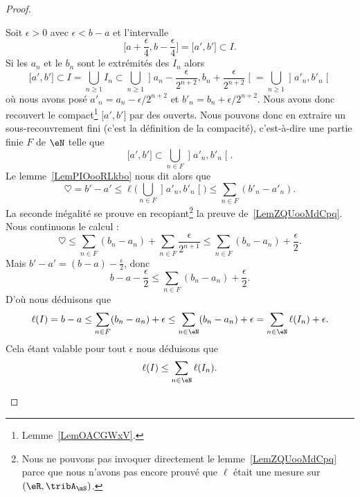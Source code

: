\begin{proof}
\begin{subproof}
		Soit \( \epsilon>0\) avec \( \epsilon<b-a\) et l'intervalle
		\begin{equation}
			\mathopen[ a+\frac{ \epsilon }{ 4 } , b-\frac{ \epsilon }{ 4 } \mathclose]=\mathopen[ a' , b' \mathclose]\subset I.
		\end{equation}
		Si les \( a_n\) et le \( b_n\) sont le extrémités des \( I_n\) alors
		\begin{equation}
			\mathopen[ a' , b' \mathclose]\subset I=\bigcup_{n\geq 1}I_n\subset\bigcup_{n\geq 1}\mathopen] a_n-\frac{ \epsilon }{ 2^{n+2} } , b_n+\frac{ \epsilon }{ 2^{n+2} } \mathclose[=\bigcup_{n\geq 1}\mathopen] a'_n , b'_n \mathclose[
		\end{equation}
		où nous avons posé \( a'_n=a_n-\epsilon/2^{n+2}\) et \( b'_n=b_n+\epsilon/2^{n+2}\). Nous avons donc recouvert le compact\footnote{Lemme~\ref{LemOACGWxV}.} \( \mathopen[ a' , b' \mathclose]\) par des ouverts. Nous pouvons donc en extraire un sous-recouvrement fini (c'est la définition de la compacité), c'est-à-dire une partie finie \( F\) de \( \eN\) telle que
		\begin{equation}
			\mathopen[ a' , b' \mathclose]\subset \bigcup_{n\in F}\mathopen] a'_n , b'_n \mathclose[.
		\end{equation}
		Le lemme~\ref{LemPIOooRLkbo} nous dit alors que
		\begin{equation}
			\heartsuit=b'-a'\leq \ell\big( \bigcup_{n\in F}\mathopen] a'_n , b'_n \mathclose[ \big)\leq \sum_{n\in F}(b'_n-a'_n).
		\end{equation}
		La seconde inégalité se prouve en recopiant\footnote{Nous ne pouvons pas invoquer directement le lemme~\ref{LemZQUooMdCpq} parce que nous n'avons pas encore prouvé que \( \ell\) était une mesure sur \(  (\eR,\tribA_{\mS})\).} la preuve de~\ref{LemZQUooMdCpq}. Nous continuons le calcul :
		\begin{equation}
			\heartsuit\leq\sum_{n\in F}(b_n-a_n)+\sum_{n\in F}\frac{ \epsilon }{ 2^{n+1} }\leq \sum_{n\in F}(b_n-a_n)+\frac{ \epsilon }{2}.
		\end{equation}
		Mais \( b'-a'=(b-a)-\frac{ \epsilon }{2}\), donc
		\begin{equation}
			b-a-\frac{ \epsilon }{2}\leq \sum_{n\in F}(b_n-a_n)+\frac{ \epsilon }{2}.
		\end{equation}
		D'où nous déduisons que
		\begin{equation}
			\ell(I)=b-a\leq \sum_{n\in F}(b_n-a_n)+\epsilon\leq \sum_{n\in \eN}(b_n-a_n)+\epsilon=\sum_{n\in \eN}\ell(I_n)+\epsilon.
		\end{equation}
		Cela étant valable pour tout \( \epsilon\) nous déduisons que
		\begin{equation}
			\ell(I)\leq\sum_{n\in \eN}\ell(I_n).
		\end{equation}


\end{subproof}
\end{proof}
